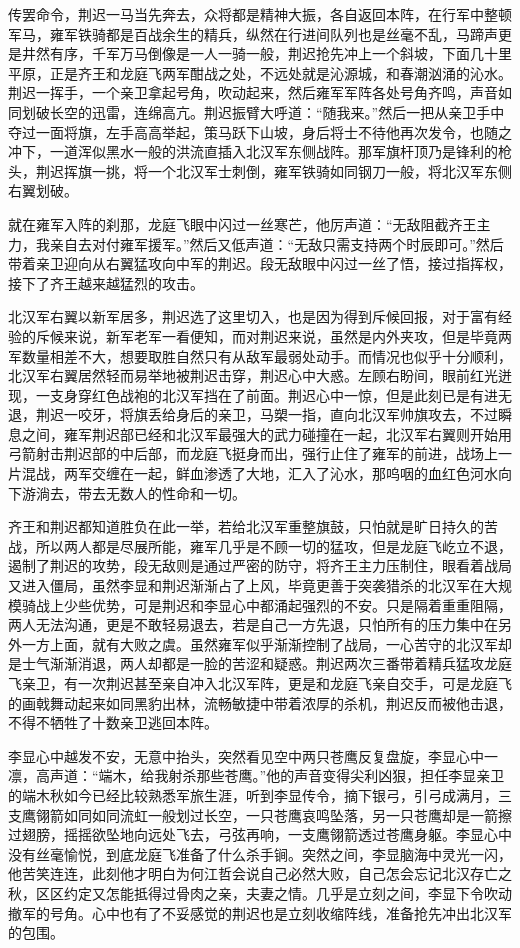传罢命令，荆迟一马当先奔去，众将都是精神大振，各自返回本阵，在行军中整顿军马，雍军铁骑都是百战余生的精兵，纵然在行进间队列也是丝毫不乱，马蹄声更是井然有序，千军万马倒像是一人一骑一般，荆迟抢先冲上一个斜坡，下面几十里平原，正是齐王和龙庭飞两军酣战之处，不远处就是沁源城，和春潮汹涌的沁水。荆迟一挥手，一个亲卫拿起号角，吹动起来，然后雍军军阵各处号角齐鸣，声音如同划破长空的迅雷，连绵高亢。荆迟振臂大呼道：“随我来。”然后一把从亲卫手中夺过一面将旗，左手高高举起，策马跃下山坡，身后将士不待他再次发令，也随之冲下，一道浑似黑水一般的洪流直插入北汉军东侧战阵。那军旗杆顶乃是锋利的枪头，荆迟挥旗一挑，将一个北汉军士刺倒，雍军铁骑如同钢刀一般，将北汉军东侧右翼划破。

就在雍军入阵的刹那，龙庭飞眼中闪过一丝寒芒，他厉声道：“无敌阻截齐王主力，我亲自去对付雍军援军。”然后又低声道：“无敌只需支持两个时辰即可。”然后带着亲卫迎向从右翼猛攻向中军的荆迟。段无敌眼中闪过一丝了悟，接过指挥权，接下了齐王越来越猛烈的攻击。

北汉军右翼以新军居多，荆迟选了这里切入，也是因为得到斥候回报，对于富有经验的斥候来说，新军老军一看便知，而对荆迟来说，虽然是内外夹攻，但是毕竟两军数量相差不大，想要取胜自然只有从敌军最弱处动手。而情况也似乎十分顺利，北汉军右翼居然轻而易举地被荆迟击穿，荆迟心中大惑。左顾右盼间，眼前红光迸现，一支身穿红色战袍的北汉军挡在了前面。荆迟心中一惊，但是此刻已是有进无退，荆迟一咬牙，将旗丢给身后的亲卫，马槊一指，直向北汉军帅旗攻去，不过瞬息之间，雍军荆迟部已经和北汉军最强大的武力碰撞在一起，北汉军右翼则开始用弓箭射击荆迟部的中后部，而龙庭飞挺身而出，强行止住了雍军的前进，战场上一片混战，两军交缠在一起，鲜血渗透了大地，汇入了沁水，那呜咽的血红色河水向下游淌去，带去无数人的性命和一切。

齐王和荆迟都知道胜负在此一举，若给北汉军重整旗鼓，只怕就是旷日持久的苦战，所以两人都是尽展所能，雍军几乎是不顾一切的猛攻，但是龙庭飞屹立不退，遏制了荆迟的攻势，段无敌则是通过严密的防守，将齐王主力压制住，眼看着战局又进入僵局，虽然李显和荆迟渐渐占了上风，毕竟更善于突袭猎杀的北汉军在大规模骑战上少些优势，可是荆迟和李显心中都涌起强烈的不安。只是隔着重重阻隔，两人无法沟通，更是不敢轻易退去，若是自己一方先退，只怕所有的压力集中在另外一方上面，就有大败之虞。虽然雍军似乎渐渐控制了战局，一心苦守的北汉军却是士气渐渐消退，两人却都是一脸的苦涩和疑惑。荆迟两次三番带着精兵猛攻龙庭飞亲卫，有一次荆迟甚至亲自冲入北汉军阵，更是和龙庭飞亲自交手，可是龙庭飞的画戟舞动起来如同黑豹出林，流畅敏捷中带着浓厚的杀机，荆迟反而被他击退，不得不牺牲了十数亲卫逃回本阵。

李显心中越发不安，无意中抬头，突然看见空中两只苍鹰反复盘旋，李显心中一凛，高声道：“端木，给我射杀那些苍鹰。”他的声音变得尖利凶狠，担任李显亲卫的端木秋如今已经比较熟悉军旅生涯，听到李显传令，摘下银弓，引弓成满月，三支鹰翎箭如同如同流虹一般划过长空，一只苍鹰哀鸣坠落，另一只苍鹰却是一箭擦过翅膀，摇摇欲坠地向远处飞去，弓弦再响，一支鹰翎箭透过苍鹰身躯。李显心中没有丝毫愉悦，到底龙庭飞准备了什么杀手锏。突然之间，李显脑海中灵光一闪，他苦笑连连，此刻他才明白为何江哲会说自己必然大败，自己怎会忘记北汉存亡之秋，区区约定又怎能抵得过骨肉之亲，夫妻之情。几乎是立刻之间，李显下令吹动撤军的号角。心中也有了不妥感觉的荆迟也是立刻收缩阵线，准备抢先冲出北汉军的包围。

